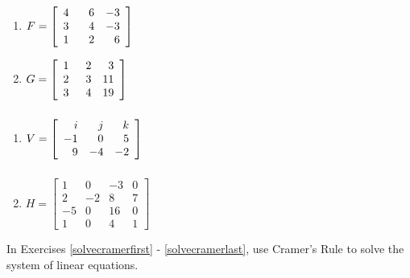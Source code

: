 \begin{multicols}{2}
\begin{enumerate}
\setcounter{enumi}{\value{HW}}

\item $F = \left[ \begin{array}{rrr} 4 & \hphantom{-}6 & -3 \\ 3 & 4 & -3 \\ 1 & 2 & 6 \end{array} \right]$
\item $G = \left[ \begin{array}{rrr} 1 & \hphantom{1}2 & 3 \\ 2 & 3 & 11 \\ 3 & 4 & 19 \end{array} \right]$ \label{matrixG}

\setcounter{HW}{\value{enumi}}
\end{enumerate}
\end{multicols}

\begin{multicols}{2}
\begin{enumerate}
\setcounter{enumi}{\value{HW}}

\item $V = \left[ \begin{array}{rrr} i & j & k \\ -1 & 0 & 5 \\ 9 & -4 & -2 \end{array} \right] \vphantom{\left[ \begin{array}{rrrr} 1 & 0 & -3 & 0 \\ 2 & -2 & 8 & 7 \\ -5 & 0 & 16 & 0 \\ 1 & 0 & 4 & 1 \end{array} \right]}$
\item $H = \left[ \begin{array}{rrrr} 1 & 0 & -3 & 0 \\ 2 & -2 & 8 & 7 \\ -5 & 0 & 16 & 0 \\ 1 & 0 & 4 & 1 \end{array} \right]$ \label{finddetlast}


\setcounter{HW}{\value{enumi}}
\end{enumerate}
\end{multicols}


In Exercises \ref{solvecramerfirst} - \ref{solvecramerlast},   use Cramer's Rule to solve the system of linear equations.

